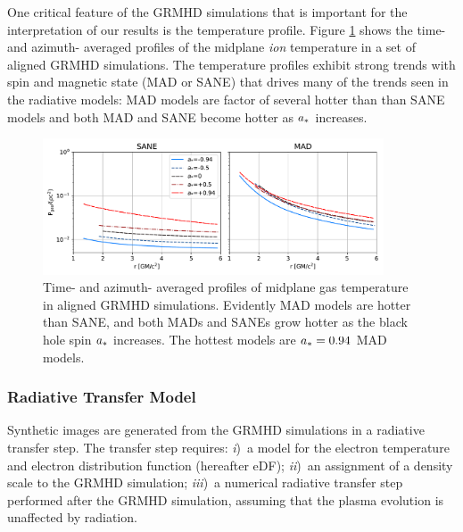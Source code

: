 One critical feature of the GRMHD simulations that is important for the interpretation of our results is the temperature profile.  Figure \ref{fig:grmhd_temp} shows the time- and azimuth- averaged profiles of the midplane {\em ion} temperature in a set of aligned GRMHD simulations.  The temperature profiles exhibit strong trends with spin and magnetic state (MAD or SANE) that drives many of the trends seen in the radiative models: MAD models are factor of several hotter than than SANE models and both MAD and SANE become hotter as $a_*$ increases.

\begin{figure}
  \centering
  \includegraphics[width=0.9\textwidth]{figures/grmhd_temp.pdf}
  \caption{Time- and azimuth- averaged profiles of midplane gas temperature in aligned GRMHD simulations.  Evidently MAD models are hotter than SANE, and both MADs and SANEs grow hotter as the black hole spin $a_*$ increases.  The hottest models are $a_* = 0.94$ MAD models.}
  \label{fig:grmhd_temp}
\end{figure}

\subsubsection{Radiative Transfer Model}

Synthetic images are generated from the GRMHD simulations in a radiative transfer step.
The transfer step requires: 
\emph{i})~a model for the electron temperature and electron distribution function (hereafter eDF);
\emph{ii})~an assignment of a density scale to the GRMHD simulation;
\emph{iii})~a numerical radiative transfer step performed after the GRMHD simulation, assuming that the plasma evolution is unaffected by radiation.

\label{sec:eDF}

